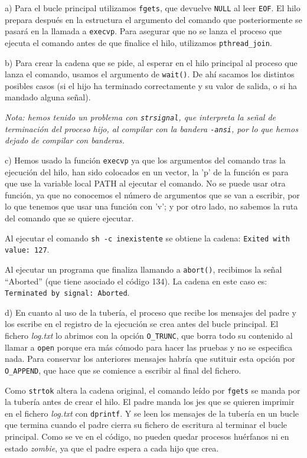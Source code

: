 \documentclass{article}
\begin{document}
a) Para el bucle principal utilizamos \texttt{fgets}, que devuelve \texttt{NULL} al leer \texttt{EOF}. El hilo prepara después en la estructura el argumento del comando que posteriormente se pasará en la llamada a \texttt{execvp}. Para asegurar que no se lanza el proceso que ejecuta el comando antes de que finalice el hilo, utilizamos \texttt{pthread\_join}.

b) Para crear la cadena que se pide, al esperar en el hilo principal al proceso que lanza el comando, usamos el argumento de \texttt{wait()}. De ahí sacamos los distintos posibles casos (si el hijo ha terminado correctamente y su valor de salida, o si ha mandado alguna señal).

\textit{ Nota: hemos tenido un problema con \texttt{strsignal}, que interpreta la señal de terminación del proceso hijo, al compilar con la bandera \texttt{-ansi}, por lo que hemos dejado de compilar con banderas.}

c) Hemos usado la función \texttt{execvp} ya que los argumentos del comando tras la ejecución del hilo, han sido colocados en un vector, la 'p' de la función es para que use la variable local PATH al ejecutar el comando. No se puede usar otra función, ya que no conocemos el número de argumentos que se van a escribir, por lo que tenemos que usar una función con 'v'; y por otro lado, no sabemos la ruta del comando que se quiere ejecutar.

Al ejecutar el comando \texttt{sh -c inexistente} se obtiene la cadena: \texttt{Exited with value: 127}.

Al ejecutar un programa que finaliza llamando a \texttt{abort()}, recibimos la señal ``Aborted'' (que tiene asociado el código 134). La cadena en este caso es: \texttt{Terminated by signal: Aborted}.

d) En cuanto al uso de la tubería, el proceso que recibe los mensajes del padre y los escribe en el registro de la ejecución se crea antes del bucle principal. El fichero \textit{log.txt} lo abrimos con la opción \texttt{O\_TRUNC}, que borra todo su contenido al llamar a \texttt{open} porque era más cómodo para hacer las pruebas y no se especifica nada. Para conservar los anteriores mensajes habría que sutituir esta opción por \texttt{O\_APPEND}, que hace que se comience a escribir al final del fichero.

Como \texttt{strtok} altera la cadena original, el comando leído por \texttt{fgets} se manda por la tubería antes de crear el hilo. El padre manda los jes que se quieren imprimir en el fichero \textit{log.txt} con \texttt{dprintf}. Y se leen los mensajes de la tubería en un bucle que termina cuando el padre cierra su fichero de escritura al terminar el bucle principal. Como se ve en el código, no pueden quedar procesos huérfanos ni en estado \textit{zombie}, ya que el padre espera a cada hijo que crea.
\end{document}

